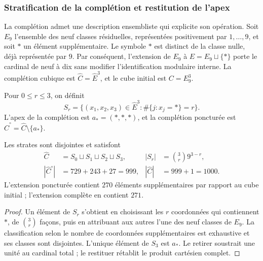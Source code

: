 \subsubsection{Stratification de la complétion et restitution de l'apex}
\label{x_reciprocidad:sec:revision-emrh}

La complétion admet une description ensembliste qui explicite son
opération. Soit \(E_9\) l'ensemble des neuf classes résiduelles, représentées
positivement par \(1,\ldots,9\), et soit \(\ast\) un élément supplémentaire.
Le symbole \(\ast\) est distinct de la classe nulle, déjà représentée par \(9\).
Par conséquent, l'extension de \(E_9\) à
\(\widehat E=E_9\sqcup\{\ast\}\) porte le cardinal de neuf à dix
sans modifier l'identification modulaire interne. La complétion cubique est
\(\widehat C=\widehat E^3\), et le cube initial est \(C=E_9^3\).

\begin{definition}
Pour \(0\leq r\leq3\), on définit
\[
 S_r=\{(x_1,x_2,x_3)\in\widehat E^3:
             \#\{j:x_j=\ast\}=r\}.
\]
L'apex de la complétion est \(a_\ast=(\ast,\ast,\ast)\), et la
complétion poncturée est \(\widehat C^{\circ}=\widehat C\setminus\{a_\ast\}\).
\end{definition}

\begin{proposition}
Les strates sont disjointes et satisfont
\begin{align}
 \widehat C&=S_0\sqcup S_1\sqcup S_2\sqcup S_3,
 &|S_r|&=\binom3r9^{3-r},\label{x_reciprocidad:eq:revision-estratos}\\
 |\widehat C^{\circ}|&=729+243+27=999,
 &|\widehat C|&=999+1=1000.\label{x_reciprocidad:eq:revision-999}
\end{align}
L'extension poncturée contient \(270\) éléments supplémentaires par rapport au cube
initial ; l'extension complète en contient \(271\).
\end{proposition}
\begin{proof}
Un élément de \(S_r\) s'obtient en choisissant les \(r\) coordonnées qui
contiennent \(\ast\), de \(\binom3r\) façons, puis en attribuant aux autres
l'une des neuf classes de \(E_9\). La classification selon le nombre de
coordonnées supplémentaires est exhaustive et ses classes sont disjointes. L'unique
élément de \(S_3\) est \(a_\ast\). Le retirer soustrait une unité au cardinal
total ; le restituer rétablit le produit cartésien complet.
\end{proof}

